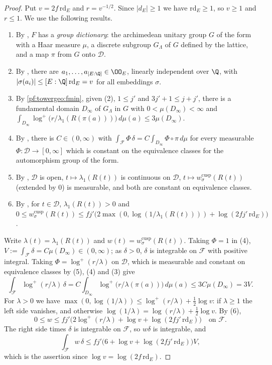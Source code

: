 \begin{proof}
Put $v=2f\,\mathrm{rd}_E$ and $r=v^{-1/2}$. Since $|d_E|\ge1$ we have $\mathrm{rd}_E\ge1$, so $v\ge1$ and
$r\le1$. We use the following results.
\begin{enumerate}[label=(\arabic*)]
\item By , $F$ has a \emph{group dictionary}: the
  archimedean unitary group $G$ of the form with a Haar measure $\mu$, a discrete subgroup $G_\Lambda$ of $G$
  defined by the lattice, and a map $\pi$ from $G$ onto $\mathcal D$.
\item By , there are $a_1,\dots,a_{[E:\Q]}\in\OO_E$,
  linearly independent over $\Q$, with $|\sigma(a_i)|\le[E:\Q]\,\mathrm{rd}_E=v$ for all embeddings
  $\sigma$.
\item By \cref{pf:towergeo:fmin}, given (2), $1\le j'$ and $3j'+1\le j+j'$,
  there is a fundamental domain $D_\infty$ of $G_\Lambda$ in $G$ with $0<\mu(D_\infty)<\infty$ and
  $\int_{D_\infty}\log^+\bigl(r/\lambda_1(R(\pi(a)))\bigr)\,d\mu(a)\le3\mu(D_\infty)$.
\item By , there is $C\in(0,\infty)$ with
  $\int_{\mathcal F}\Phi\,\delta=C\int_{D_\infty}\Phi\circ\pi\,d\mu$ for every measurable
  $\Phi\colon\mathcal D\to[0,\infty]$ which is constant on the equivalence classes for the automorphism group
  of the form.
\item By , $\mathcal D$ is open,
  $t\mapsto\lambda_1(R(t))$ is continuous on $\mathcal D$, $t\mapsto w^{\mathrm{cusp}}_\sigma(R(t))$ (extended
  by $0$) is measurable, and both are constant on equivalence classes.
\item By , for $t\in\mathcal D$,
  $\lambda_1(R(t))>0$ and
  $0\le w^{\mathrm{cusp}}_\sigma(R(t))\le fj'\bigl(2\max(0,\log(1/\lambda_1(R(t))))+\log(2fj'\,\mathrm{rd}_E)\bigr)$.
\end{enumerate}
Write $\lambda(t)=\lambda_1(R(t))$ and $w(t)=w^{\mathrm{cusp}}_\sigma(R(t))$. Taking $\Phi=1$ in (4),
$V:=\int_{\mathcal F}\delta=C\mu(D_\infty)\in(0,\infty)$; as $\delta>0$, $\delta$ is integrable on $\mathcal F$
with positive integral. Taking $\Phi=\log^+(r/\lambda)$ on $\mathcal D$, which is measurable and constant on
equivalence classes by (5), (4) and (3) give
\[
\int_{\mathcal F}\log^+(r/\lambda)\,\delta=C\int_{D_\infty}\log^+\bigl(r/\lambda(\pi(a))\bigr)\,d\mu(a)\le3C\mu(D_\infty)=3V.
\]
For $\lambda>0$ we have $\max(0,\log(1/\lambda))\le\log^+(r/\lambda)+\frac12\log v$: if $\lambda\ge1$ the left
side vanishes, and otherwise $\log(1/\lambda)=\log(r/\lambda)+\frac12\log v$. By (6),
\[
0\le w\le fj'\bigl(2\log^+(r/\lambda)+\log v+\log(2fj'\,\mathrm{rd}_E)\bigr)\quad\text{on }\mathcal F.
\]
The right side times $\delta$ is integrable on $\mathcal F$, so $w\delta$ is integrable, and
\[
\int_{\mathcal F}w\,\delta\le fj'\bigl(6+\log v+\log(2fj'\,\mathrm{rd}_E)\bigr)V,
\]
which is the assertion since $\log v=\log(2f\,\mathrm{rd}_E)$.
\end{proof}

